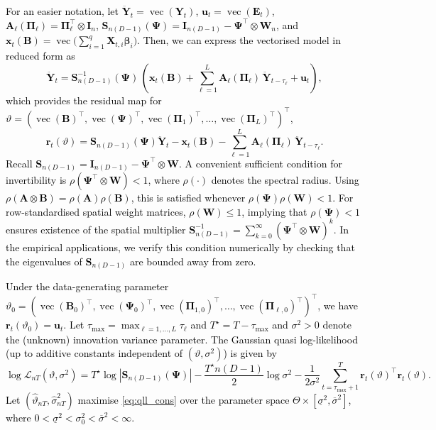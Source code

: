 \documentclass[12pt]{article}
\theoremstyle{plain}
\theoremstyle{definition}
\DeclareMathOperator{\vop}{vec}
\newcommand{\xvec}{\boldsymbol}
\newcommand{\xmat}{\mathbf}
\begin{document}
\textcolor{black}{For an easier notation, let $\ddot{\xvec{Y}}_t = \vop(\xmat{Y}_t)$, $\xvec{u}_t = \vop(\xmat{E}_t)$,
$\xmat{A}_\ell(\xmat{\Pi}_\ell)=\xmat{\Pi}_\ell^\top\otimes \xmat{I}_n$,
$\xmat{S}_{n(D-1)}(\xmat{\Psi}) = \xmat{I}_{n(D-1)} - \xmat{\Psi}^\top\otimes \xmat{W}_n$, and
$\xvec{x}_t(\xmat{B}) = \vop\!\Big(\sum_{i=1}^q \xmat{X}_{t,i}\xvec{\beta}_i\Big)$.
Then, we can express the vectorised model in reduced form as
\begin{equation}\label{eq:reduced_cons}
\ddot{\xvec{Y}}_t
=
\xmat{S}^{-1}_{n(D-1)}(\xmat{\Psi})\,  \left( \xvec{x}_t(\xmat{B})
+ \sum_{\ell=1}^{L}\xmat{A}_\ell(\xmat{\Pi}_\ell)\,\ddot{\xvec{Y}}_{t-\tau_\ell}
+ \xvec{u}_t \right),
\end{equation}
which provides the residual map for
$\vartheta=(\vop(\xmat{B})^\top, \vop(\xmat{\Psi})^\top, \vop(\xmat{\Pi}_1)^\top,\ldots,\vop(\xmat{\Pi}_L)^\top)^\top$,
\[
\xvec{r}_t(\vartheta)
=
\xmat{S}_{n(D-1)}(\xmat{\Psi}) \ddot{\xvec{Y}}_{t}
-\xvec{x}_t(\xmat{B})
-\sum_{\ell=1}^{L}\xmat{A}_\ell(\xmat{\Pi}_\ell)\,\ddot{\xvec{Y}}_{t-\tau_\ell}.
\]
Recall $\xmat{S}_{n(D-1)}= \xmat{I}_{n(D-1)}- \xmat{\Psi} ^\top\!\otimes \xmat{W}$.  A convenient sufficient condition for invertibility is $\rho(\xmat{\Psi}^\top\!\otimes \xmat{W})<1$, where $\rho(\cdot)$ denotes the spectral radius. Using $\rho(\xmat{A}\otimes \xmat{B})=\rho(\xmat{A})\rho(\xmat{B})$, this is satisfied whenever  $\rho(\xmat{\Psi})\rho(\xmat{W})<1$. For row-standardised spatial weight matrices, $\rho(\xmat{W})\le 1$, implying that $\rho(\xmat{\Psi})<1$ ensures existence of the spatial multiplier $\xmat{S}_{n(D-1)}^{-1}=\sum_{k=0}^{\infty}(\xmat{\Psi}^\top\!\otimes \xmat{W})^k$. In the empirical applications, we verify this condition numerically by checking that the eigenvalues of $\xmat{S}_{n(D-1)}$ are bounded away from zero.}

\textcolor{black}{Under the data-generating parameter \linebreak $\vartheta_0 = (\vop(\xmat{B}_0)^\top, \vop(\xmat{\Psi}_0)^\top, \vop(\xmat{\Pi}_{1,0})^\top, \ldots,  \vop(\xmat{\Pi}_{\ell,0})^\top)^\top$, we have $\xvec{r}_t(\vartheta_0)=\xvec{u}_t$.  Let $\tau_{\max} = \max_{\ell=1,\ldots,L}\tau_\ell$ and $T^\star = T-\tau_{\max}$ and $\sigma^2 > 0$ denote the (unknown) innovation variance parameter.
The Gaussian quasi log-likelihood (up to additive constants independent of $(\vartheta,\sigma^2)$) is given by
\small{
\begin{equation}\label{eq:qll_cons}
\log \mathcal{L}_{nT}(\vartheta,\sigma^2)
=
T^\star\log|\xmat{S}_{n(D-1)}(\xmat{\Psi})|
-\frac{T^\star n(D-1)}{2}\log\sigma^2
-\frac{1}{2\sigma^2}\sum_{t=\tau_{\max}+1}^{T} \xvec{r}_t(\vartheta)^\top \xvec{r}_t(\vartheta).
\end{equation}
}
Let $(\hat\vartheta_{nT},\hat\sigma^2_{nT})$ maximise \eqref{eq:qll_cons} over the parameter space
$\Theta\times[\underline\sigma^2,\overline\sigma^2]$, where
$0<\underline\sigma^2<\sigma_0^2<\overline\sigma^2<\infty$.}
\end{document}
